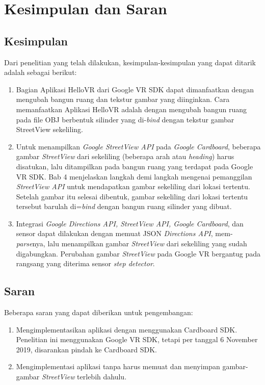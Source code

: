 \chapter{Kesimpulan dan Saran}
\label{chap:conc}

\section{Kesimpulan}
Dari penelitian yang telah dilakukan, kesimpulan-kesimpulan yang dapat ditarik adalah sebagai berikut:

\begin{enumerate}
	\item Bagian Aplikasi HelloVR dari Google VR SDK dapat dimanfaatkan dengan mengubah bangun ruang dan tekstur gambar yang diinginkan. Cara memanfaatkan Aplikasi HelloVR adalah dengan mengubah bangun ruang pada file OBJ berbentuk silinder yang di-\textit{bind} dengan tekstur gambar StreetView sekeliling. 
	
	\item Untuk menampilkan \textit{Google StreetView API} pada \textit{Google Cardboard}, beberapa gambar \textit{StreetView} dari sekeliling (beberapa arah atau \textit{heading}) harus disatukan, lalu ditampilkan pada bangun ruang yang terdapat pada Google VR SDK. Bab 4 menjelaskan langkah demi langkah mengenai pemanggilan \textit{StreetView API} untuk mendapatkan gambar sekeliling dari lokasi tertentu. Setelah gambar itu selesai dibentuk, gambar sekeliling dari lokasi tertentu tersebut barulah di=\textit{bind} dengan bangun ruang silinder yang dibuat. 
	
	\item Integrasi \textit{Google Directions API, StreetView API, Google Cardboard}, dan sensor dapat dilakukan dengan memuat JSON \textit{Directions API}, mem-\textit{parse}nya, lalu menampilkan gambar \textit{StreetView} dari sekeliling yang sudah digabungkan. Perubahan gambar \textit{StreetView} pada Google VR bergantug pada rangsang yang diterima sensor \textit{step detector}.  
\end{enumerate}

\section{Saran}
Beberapa saran yang dapat diberikan untuk pengembangan:

\begin{enumerate}	
	\item Mengimplementasikan aplikasi dengan menggunakan Cardboard SDK. Penelitian ini menggunakan Google VR SDK, tetapi per tanggal 6 November 2019, disarankan pindah ke Cardboard SDK.  
	
	\item Mengimplementasi aplikasi tanpa harus memuat dan menyimpan gambar-gambar \textit{StreetView} terlebih dahulu.
	
	
\end{enumerate}